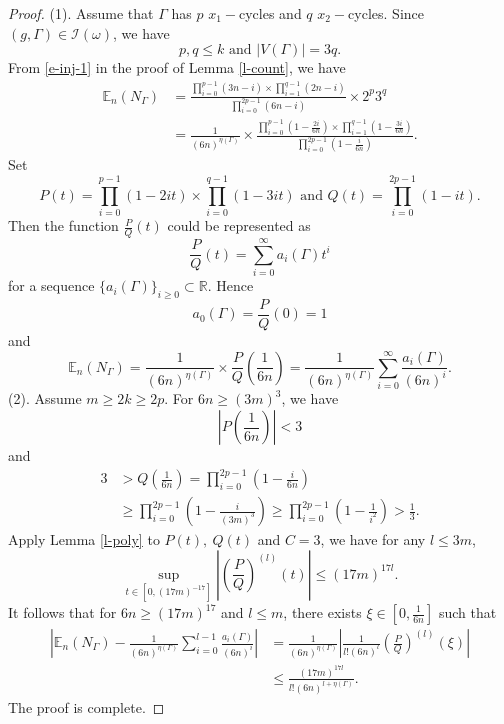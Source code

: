\documentclass{amsart}
\theoremstyle{plain}
\theoremstyle{definition}
\theoremstyle{remark}
\begin{document}
\begin{proof}
   (1). Assume that $\Gamma$ has $p$ $x_1-$cycles and $q$ $x_2-$cycles. Since $(g,\Gamma)\in\mathcal{I}(\omega)$, we have
    $$p,q\leq k\text{ and }|V(\Gamma)|=3q.$$
    From \eqref{e-inj-1} in the proof of Lemma \ref{l-count}, we have
    \begin{align*}
    \mathbb{E}_n(N_\Gamma)&=\frac{\prod\limits_{i=0}^{p-1}(3n-i)\times\prod\limits_{i=1}^{q-1}(2n-i)}{\prod\limits_{i=0}^{2p-1}(6n-i)}\times 2^p3^q\\
    &=\frac{1}{(6n)^{\eta(\Gamma)}}\times\frac{\prod\limits_{i=0}^{p-1}\left(1-\frac{2i}{6n}\right)\times\prod\limits_{i=1}^{q-1}\left(1-\frac{3i}{6n}\right)}{\prod\limits_{i=0}^{2p-1}\left(1-\frac{i}{6n}\right)}.
    \end{align*}
     Set 
$$P(t)=\prod\limits_{i=0}^{p-1}\left(1-2it\right)\times\prod\limits_{i=0}^{q-1}\left(1-3it\right)
\text{ and } 
Q(t)=\prod\limits_{i=0}^{2p-1}\left(1-it\right).$$
Then the function $\frac{P}{Q}(t)$ could be represented as $$\frac{P}{Q}(t)=\sum\limits_{i=0}^\infty a_i(\Gamma)t^i$$
for a sequence $\{a_i(\Gamma)\}_{i\geq 0}\subset\mathbb{R}$. Hence
$$a_0(\Gamma)=\frac{P}{Q}(0)=1$$
and
$$\mathbb{E}_n(N_\Gamma)=\frac{1}{(6n)^{\eta(\Gamma)}}\times \frac{P}{Q}\left(\frac{1}{6n}\right)=\frac{1}{(6n)^{\eta(\Gamma)}}\sum\limits_{i=0}^\infty\frac{a_i(\Gamma)}{(6n)^i}.$$
(2). Assume $m\geq 2k\geq 2p$. For 
 $6n\geq (3m)^3$, we have
$$\left|P\left(\frac{1}{6n}\right)\right|<3$$
and 
\begin{align*}
3& >Q\left(\frac{1}{6n}\right)=\prod\limits_{i=0}^{2p-1}\left(1-\frac{i}{6n}\right)\\ &\geq \prod\limits_{i=0}^{2p-1}\left(1-\frac{i}
{(3m)^{3}}\right)
\geq \prod\limits_{i=0}^{2p-1}\left(1-\frac{1}{i^2}\right)> \frac{1}{3}.
\end{align*}
Apply Lemma \ref{l-poly} to $P(t),\ Q(t)$ and $C=3$, we have for any $l\leq 3m$,  
$$\sup\limits_{t\in \left[0,(17m)^{-17}\right]}\left|\left(\frac{P}{Q}\right)^{(l)}(t)\right|\leq (17m)^{17l}.$$
It follows that for $6n\geq (17 m)^{17}$ and $l\leq m$, there exists $\xi\in[0,\frac{1}{6n}]$ such that
\begin{align*}
    \left|\mathbb{E}_n(N_\Gamma)-\frac{1}{(6n)^{\eta(\Gamma)}}\sum\limits_{i=0}^{l-1}\frac{a_i(\Gamma)}{(6n)^i}\right|&=\frac{1}{(6n)^{\eta(\Gamma)}}\left|\frac{1}{l!(6n)^l}\left(\frac{P}{Q}\right)^{(l)}(\xi)\right|\\
    &\leq \frac{(17m)^{17l}}{l!(6n)^{l+\eta(\Gamma)}}.
\end{align*}
The proof is complete.
\end{proof}
\end{document}

